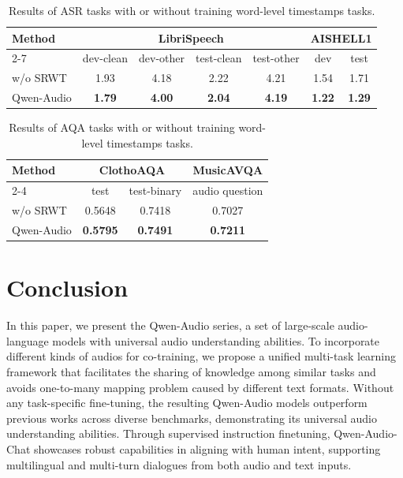 \documentclass{article}
\begin{document}
\begin{table}[t!]
\centering
\caption{Results of ASR tasks with or without training word-level timestamps tasks.}
\vspace{-2mm}
\begin{tabular}{lcccccc}
\toprule
\multirow{2}{*}{\textbf{Method}} & \multicolumn{4}{c}{\textbf{LibriSpeech} }                              & \multicolumn{2}{c}{\textbf{AISHELL1}}  \\ \cmidrule(l){2-7} 
                  & dev-clean     & dev-other     & test-clean    & test-other    & dev           & test          \\ \midrule
w/o SRWT & 1.93          & 4.18          & 2.22          & 4.21          & 1.54          & 1.71          \\
Qwen-Audio               & \textbf{1.79} & \textbf{4.00} & \textbf{2.04} & \textbf{4.19} & \textbf{1.22} & \textbf{1.29} \\ \bottomrule
\end{tabular}%
\label{tab:ab_asr}
\end{table}


\begin{table}[t!]
\centering
\caption{Results of AQA tasks with or without training word-level timestamps tasks.}
\vspace{-2mm}
\begin{tabular}{lccc}
\toprule
\multirow{2}{*}{\textbf{Method}} & \multicolumn{2}{c}{\textbf{ClothoAQA}}     & \textbf{MusicAVQA}       \\ \cmidrule(l){2-4} 
                  & test            & test-binary     & audio question  \\ \midrule
w/o SRWT & 0.5648          & 0.7418          & 0.7027          \\
Qwen-Audio      & \textbf{0.5795} & \textbf{0.7491} & \textbf{0.7211} \\ \bottomrule
\end{tabular}%
\label{tab:ab_aqa}
\end{table}


\section{Conclusion}
\label{sec:conclusion}
In this paper, we present the Qwen-Audio series, a set of large-scale audio-language models with universal audio understanding abilities. To incorporate different kinds of audios for co-training, we propose a unified multi-task learning framework that facilitates the sharing of knowledge among similar tasks and avoids one-to-many mapping problem caused by different text formats. Without any task-specific fine-tuning, the resulting Qwen-Audio models outperform previous works across diverse benchmarks, demonstrating its universal audio understanding abilities. Through supervised instruction finetuning, Qwen-Audio-Chat showcases robust capabilities in aligning with human intent, supporting multilingual and multi-turn dialogues from both audio and text inputs. 
\end{document}

